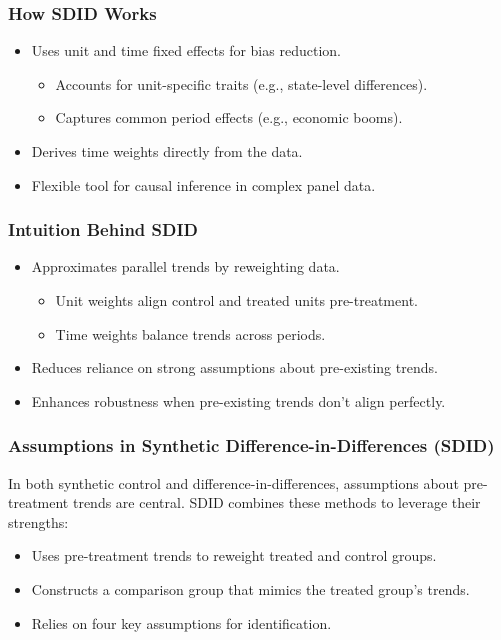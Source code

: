 \documentclass{beamer}
\begin{document}
\begin{frame}
\frametitle{How SDID Works}

\begin{itemize}
    \item Uses unit and time fixed effects for bias reduction.
        \begin{itemize}
            \item Accounts for unit-specific traits (e.g., state-level differences).
            \item Captures common period effects (e.g., economic booms).
        \end{itemize}
    \item Derives time weights directly from the data.
    \item Flexible tool for causal inference in complex panel data.
\end{itemize}

\end{frame}

\begin{frame}
\frametitle{Intuition Behind SDID}

\begin{itemize}
    \item Approximates parallel trends by reweighting data.
        \begin{itemize}
            \item Unit weights align control and treated units pre-treatment.
            \item Time weights balance trends across periods.
        \end{itemize}
    \item Reduces reliance on strong assumptions about pre-existing trends.
    \item Enhances robustness when pre-existing trends don’t align perfectly.
\end{itemize}

\end{frame}


\begin{frame}
\frametitle{Assumptions in Synthetic Difference-in-Differences (SDID)}

In both synthetic control and difference-in-differences, assumptions about pre-treatment trends are central. SDID combines these methods to leverage their strengths:

\begin{itemize}
    \item Uses pre-treatment trends to reweight treated and control groups.
    \item Constructs a comparison group that mimics the treated group's trends.
    \item Relies on four key assumptions for identification.
\end{itemize}

\end{frame}
\end{document}
